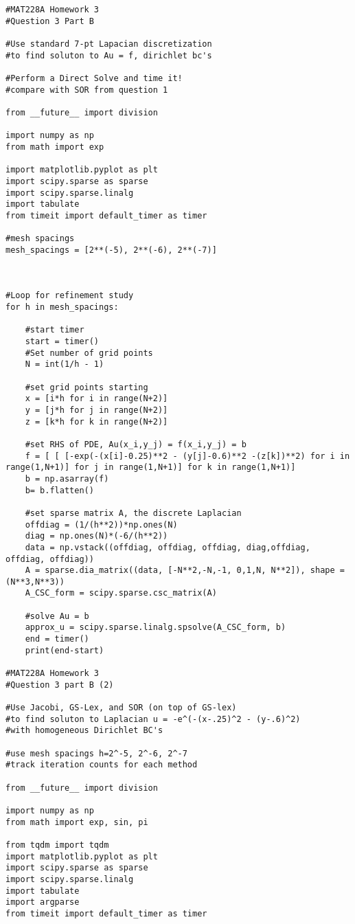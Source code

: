 \documentclass[12pt]{article}
\begin{document}
\begin{verbatim}
#MAT228A Homework 3
#Question 3 Part B

#Use standard 7-pt Lapacian discretization 
#to find soluton to Au = f, dirichlet bc's

#Perform a Direct Solve and time it!
#compare with SOR from question 1

from __future__ import division

import numpy as np
from math import exp

import matplotlib.pyplot as plt
import scipy.sparse as sparse
import scipy.sparse.linalg
import tabulate
from timeit import default_timer as timer 

#mesh spacings
mesh_spacings = [2**(-5), 2**(-6), 2**(-7)]



#Loop for refinement study
for h in mesh_spacings:

	#start timer
	start = timer()
	#Set number of grid points
	N = int(1/h - 1)

	#set grid points starting 
	x = [i*h for i in range(N+2)]
	y = [j*h for j in range(N+2)]
	z = [k*h for k in range(N+2)]

	#set RHS of PDE, Au(x_i,y_j) = f(x_i,y_j) = b
	f = [ [ [-exp(-(x[i]-0.25)**2 - (y[j]-0.6)**2 -(z[k])**2) for i in range(1,N+1)] for j in range(1,N+1)] for k in range(1,N+1)]
	b = np.asarray(f)
	b= b.flatten()

	#set sparse matrix A, the discrete Laplacian
	offdiag = (1/(h**2))*np.ones(N)
	diag = np.ones(N)*(-6/(h**2))
	data = np.vstack((offdiag, offdiag, offdiag, diag,offdiag, offdiag, offdiag))
	A = sparse.dia_matrix((data, [-N**2,-N,-1, 0,1,N, N**2]), shape = (N**3,N**3))
	A_CSC_form = scipy.sparse.csc_matrix(A)

	#solve Au = b
	approx_u = scipy.sparse.linalg.spsolve(A_CSC_form, b)
	end = timer()
	print(end-start)

#MAT228A Homework 3
#Question 3 part B (2)

#Use Jacobi, GS-Lex, and SOR (on top of GS-lex)
#to find soluton to Laplacian u = -e^(-(x-.25)^2 - (y-.6)^2)
#with homogeneous Dirichlet BC's

#use mesh spacings h=2^-5, 2^-6, 2^-7
#track iteration counts for each method

from __future__ import division

import numpy as np
from math import exp, sin, pi

from tqdm import tqdm
import matplotlib.pyplot as plt
import scipy.sparse as sparse
import scipy.sparse.linalg
import tabulate
import argparse
from timeit import default_timer as timer 


\end{verbatim}
\end{document}
